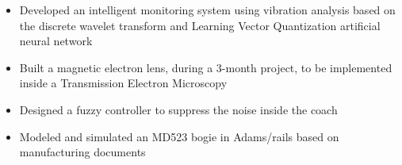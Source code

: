 \documentclass[10pt,letterpaper,ragged2e,compact]{mocv}
\begin{document}
\begin{paracol}{2}
\begin{itemize}
        \item Developed an intelligent monitoring system using vibration analysis based on the discrete wavelet transform and Learning Vector Quantization artificial neural network
    \end{itemize}
    \divider
    \begin{itemize}
        \item  Built a magnetic electron lens, during a 3-month project, to be implemented inside a Transmission Electron Microscopy
    \end{itemize}
    \divider
    \begin{itemize}
        \item Designed a fuzzy controller to suppress the noise inside the coach
    \end{itemize}
    \divider
    \begin{itemize}
        \item Modeled and simulated an MD523 bogie in Adams/rails based on manufacturing documents
    \end{itemize}


\end{paracol}
\end{document}
